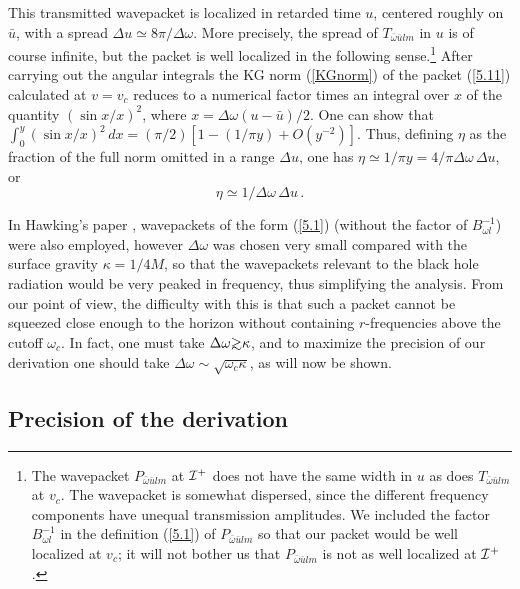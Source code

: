 \documentclass[12pt]{article}
\def\gtwid{\raise.3ex\hbox{$>$\kern-.75em\lower1ex\hbox{$\sim$}}}
\def\o{\omega}
\def\obar{\bar{\omega}}
\def\ubar{\bar{u}}
\def\futI{{\cal I}^+}
\begin{document}
This transmitted wavepacket is localized in retarded time
$u$, centered roughly on $\ubar$, with a spread
$\Delta u\simeq 8\pi/\Delta\o$. More precisely,
the spread of $T_{\obar\ubar lm}$ in $u$ is
of course infinite, but the packet is well localized in the
following sense.\footnote{The wavepacket
$P_{\obar\ubar lm}$ at $\futI$
does not have the same width in $u$ as does
$T_{\obar\ubar lm}$ at $v_c$. The wavepacket is somewhat
dispersed, since the different frequency
components have unequal transmission amplitudes.
We included the factor $B_{\o l}^{-1}$ in the
definition (\ref{5.1}) of $P_{\obar\ubar lm}$ so that
our packet would be well localized at $v_c$; it will not
bother us that $P_{\obar\ubar lm}$ is not as well localized
at $\futI$.}
After carrying out the
angular integrals the KG norm (\ref{KGnorm}) of the packet
(\ref{5.11})
calculated at $v=v_c$ reduces to a numerical factor times an
integral over $x$ of the quantity $(\sin x/x)^2$, where
$x=\Delta\o(u-\ubar)/2$.
One can show that
$\int_0^y(\sin x/x)^2\, dx=(\pi/2)[1-(1/\pi y)+O(y^{-2})]$.
Thus, defining $\eta$ as the fraction of the full norm omitted in a
range $\Delta u$, one
has $\eta\simeq 1/\pi y = 4/\pi \Delta\omega\, \Delta u$, or
\begin{equation}
\eta\simeq 1/\Delta\omega\, \Delta u\, .
\label{eq:eta}
\end{equation}

In Hawking's paper \cite{Hawk75}, wavepackets of the
form (\ref{5.1}) (without the factor of $B_{\o l}^{-1}$)
were also employed, however
$\Delta\o$ was chosen very small compared with
the surface gravity $\kappa=1/4M$, so that the wavepackets
relevant to the black hole radiation would be very peaked
in frequency, thus simplifying the analysis. From our point
of view, the difficulty with this is that
such a packet cannot be squeezed close enough to the horizon
without containing $r$-frequencies above the cutoff $\o_c$.
In fact, one must take $\Delta\o\gtwid \kappa$, and to maximize
the precision of our derivation one should take
$\Delta\o\sim \sqrt{\o_c\kappa}$, as will now be shown.

\subsection{Precision of the derivation}
\label{subsec:precision}
\end{document}
